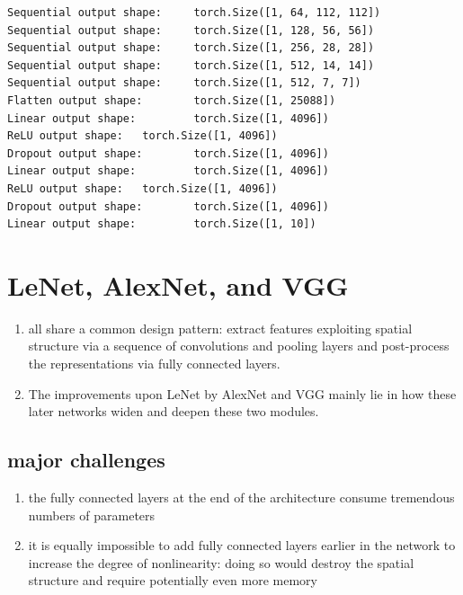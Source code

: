 \begin{lstlisting}[numbers=none]
Sequential output shape:     torch.Size([1, 64, 112, 112])
Sequential output shape:     torch.Size([1, 128, 56, 56])
Sequential output shape:     torch.Size([1, 256, 28, 28])
Sequential output shape:     torch.Size([1, 512, 14, 14])
Sequential output shape:     torch.Size([1, 512, 7, 7])
Flatten output shape:        torch.Size([1, 25088])
Linear output shape:         torch.Size([1, 4096])
ReLU output shape:   torch.Size([1, 4096])
Dropout output shape:        torch.Size([1, 4096])
Linear output shape:         torch.Size([1, 4096])
ReLU output shape:   torch.Size([1, 4096])
Dropout output shape:        torch.Size([1, 4096])
Linear output shape:         torch.Size([1, 10])
\end{lstlisting}






\section*{LeNet, AlexNet, and VGG \cite{dnn-1}}
\begin{enumerate}
    \item all share a common design pattern: extract features exploiting spatial structure via a sequence of convolutions and pooling layers and post-process the representations via fully connected layers.

    \item The improvements upon LeNet by AlexNet and VGG mainly lie in how these later networks widen and deepen these two modules.

    
\end{enumerate}


\subsection*{major challenges \cite{dnn-1}}
\begin{enumerate}
    \item the fully connected layers at the end of the architecture consume tremendous numbers of parameters

    \item it is equally impossible to add fully connected layers earlier in the network to increase the degree of nonlinearity: doing so would destroy the spatial structure and require potentially even more memory

\end{enumerate}






